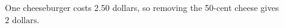 One cheeseburger costs 2.50 dollars, so removing the 50-cent cheese gives $\boxed{2\text{ dollars}}$.

